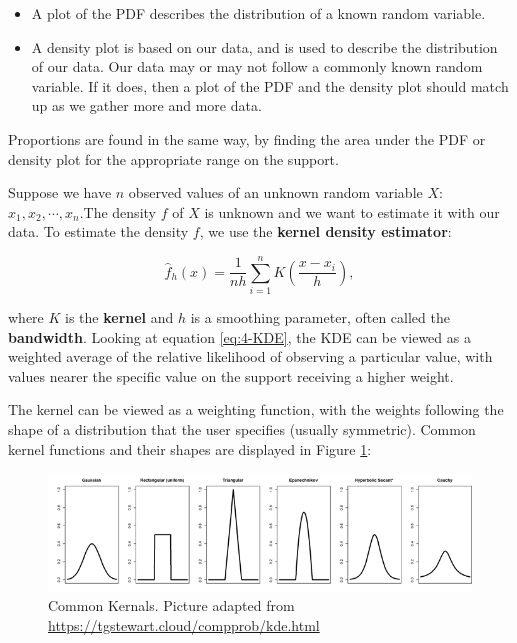 \documentclass[
]{book}
\providecommand{\tightlist}{%
  \setlength{\itemsep}{0pt}\setlength{\parskip}{0pt}}
\begin{document}
\begin{itemize}
\tightlist
\item
  A plot of the PDF describes the distribution of a known random variable.
\item
  A density plot is based on our data, and is used to describe the distribution of our data. Our data may or may not follow a commonly known random variable. If it does, then a plot of the PDF and the density plot should match up as we gather more and more data.
\end{itemize}

Proportions are found in the same way, by finding the area under the PDF or density plot for the appropriate range on the support.

Suppose we have \(n\) observed values of an unknown random variable \(X\): \(x_1, x_2, \cdots, x_n\).The density \(f\) of \(X\) is unknown and we want to estimate it with our data. To estimate the density \(f\), we use the \textbf{kernel density estimator}:

\begin{equation} 
\hat{f}_h(x) = \frac{1}{nh} \sum_{i=1}^n K \left( \frac{x-x_i}{h}\right ),
\label{eq:4-KDE}
\end{equation}

where \(K\) is the \textbf{kernel} and \(h\) is a smoothing parameter, often called the \textbf{bandwidth}. Looking at equation \eqref{eq:4-KDE}, the KDE can be viewed as a weighted average of the relative likelihood of observing a particular value, with values nearer the specific value on the support receiving a higher weight.

The kernel can be viewed as a weighting function, with the weights following the shape of a distribution that the user specifies (usually symmetric). Common kernel functions and their shapes are displayed in Figure \ref{fig:4-KDE}:

\begin{figure}
\centering
\includegraphics{images/04-KDE.png}
\caption{\label{fig:4-KDE}Common Kernals. Picture adapted from \url{https://tgstewart.cloud/compprob/kde.html}}
\end{figure}
\end{document}
